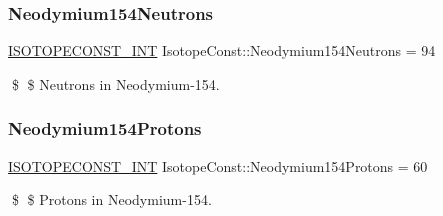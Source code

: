 \subsubsection{\texorpdfstring{Neodymium154\+Neutrons}{Neodymium154Neutrons}}
{\footnotesize\ttfamily \mbox{\hyperlink{group___isotope_const-_macros_ga5f18360b3e99483a35c32d789e62621c}{I\+S\+O\+T\+O\+P\+E\+C\+O\+N\+S\+T\+\_\+\+I\+NT}} Isotope\+Const\+::\+Neodymium154\+Neutrons = 94}

\$ \$ Neutrons in Neodymium-\/154. \mbox{\label{group___isotope_const-_neodymium-_nd154_ga77b783b2151461904b3f9f3b9b951ce9}} 
\subsubsection{\texorpdfstring{Neodymium154\+Protons}{Neodymium154Protons}}
{\footnotesize\ttfamily \mbox{\hyperlink{group___isotope_const-_macros_ga5f18360b3e99483a35c32d789e62621c}{I\+S\+O\+T\+O\+P\+E\+C\+O\+N\+S\+T\+\_\+\+I\+NT}} Isotope\+Const\+::\+Neodymium154\+Protons = 60}

\$ \$ Protons in Neodymium-\/154. 